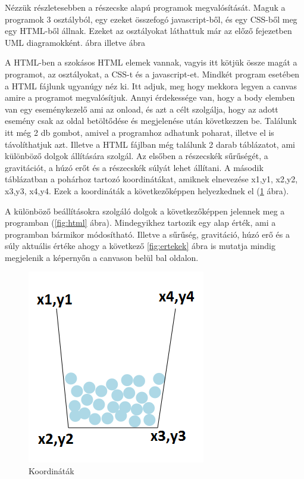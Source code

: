 


Nézzük részletesebben a részecske alapú programok megvalósítását. Maguk a programok 3 osztályból, egy ezeket összefogó javascript-ből, és egy CSS-ből meg egy HTML-ből állnak. Ezeket az osztályokat láthattuk már az előző fejezetben UML diagramokként.  ábra illetve   ábra


A HTML-ben a szokásos HTML elemek vannak, vagyis itt kötjük össze magát a programot, az osztályokat, a CSS-t és a javascript-et. Mindkét program esetében a HTML fájlunk ugyanúgy néz ki. Itt adjuk, meg hogy mekkora legyen a canvas amire a programot megvalósítjuk. Annyi érdekessége van, hogy a body elemben van egy eseménykezelő ami az onload, és azt a célt szolgálja, hogy az adott esemény csak az oldal betöltődése és megjelenése után következzen be.
Találunk itt még 2 db gombot, amivel a programhoz adhatunk poharat, illetve el is távolíthatjuk azt.
Illetve a HTML fájlban még találunk 2 darab táblázatot, ami különböző dolgok állítására szolgál. Az elsőben a részecskék sűrűségét, a gravitációt, a húzó erőt és a részecskék súlyát lehet állítani. 
A második táblázatban a pohárhoz tartozó koordinátákat, amiknek elnevezése x1,y1, x2,y2, x3,y3, x4,y4. Ezek a koordináták a következőképpen helyezkednek el (\ref{fig:pohar} ábra).

A különböző beállításokra szolgáló dolgok a következőképpen jelennek meg a programban (\ref{fig:html} ábra). Mindegyikhez tartozik egy alap érték, ami a programban bármikor módosítható. Illetve a sűrűség, gravitáció, húzó erő és a súly aktuális értéke ahogy a  következő \ref{fig:ertekek} ábra is mutatja mindig megjelenik a képernyőn a canvason belül bal oldalon. 

\begin{figure}[h]
	\centering
	\includegraphics[scale=1]{images/pohar.png}
	\caption{Koordináták}
	\label{fig:pohar}
\end{figure}


